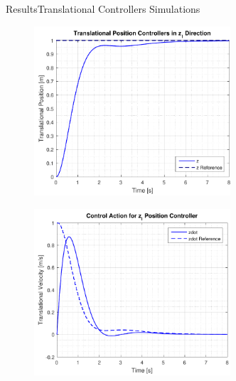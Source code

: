\begin{frame}{Results}{Translational Controllers Simulations}
    \begin{minipage}{\linewidth}
        \begin{minipage}{0.49\linewidth}
             \begin{figure}[H]
                 \centering
                 \includegraphics[width=0.65\textwidth]{figures/zStep}  
             \end{figure}   
        \end{minipage}
        \hspace{0.03\linewidth}
        \begin{minipage}{0.49\linewidth}
             \begin{figure}[H]
                 \centering
                 \includegraphics[width=0.65\textwidth]{figures/zStepAction}  
               \end{figure}               
        \end{minipage}
    \end{minipage}

\end{frame}

